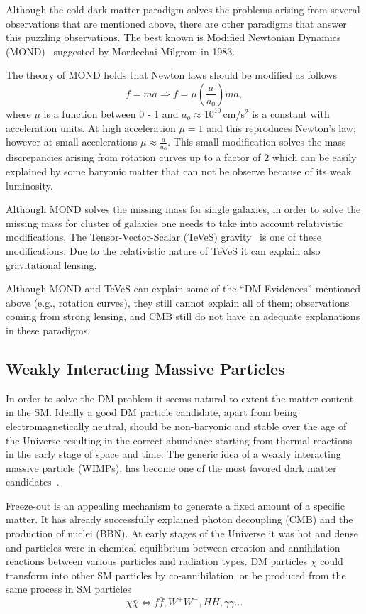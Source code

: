 Although the cold dark matter paradigm solves the problems arising from several observations that are mentioned above, there are other paradigms that answer this puzzling observations. The best known is Modified Newtonian Dynamics (MOND)~\cite{Milgrom:1983ca} suggested by Mordechai Milgrom in 1983.

The theory of MOND holds that Newton laws should be modified as follows
\begin{equation}
	f= ma \Rightarrow f= \mu\left(\frac{a}{a_0}\right)ma,
\end{equation}
where $\mu$ is a function between 0 - 1 and $a_o \approx 10^{10}$\,cm/s$^2$ is a constant with acceleration units. At high acceleration $\mu =1$ and this reproduces Newton’s law; however at small accelerations $\mu \approx \frac{a}{a_0}$. This small modification solves the mass discrepancies arising from rotation curves up to a factor of 2 which can be easily explained by some baryonic matter that can not be observe because of its weak luminosity.

Although MOND solves the missing mass for single galaxies, in order to solve the missing mass for cluster of galaxies one needs to take into account relativistic modifications. The Tensor-Vector-Scalar (TeVeS) gravity~\cite{Bekenstein:2009bd} is one of these modifications. Due to the relativistic nature of TeVeS it can explain also gravitational
lensing.

Although MOND and TeVeS can explain some of the ``DM Evidences'' mentioned above (e.g., rotation curves), they still cannot explain all of them; observations coming from strong lensing, and CMB still do not have an adequate explanations in these paradigms.


\subsection{Weakly Interacting Massive Particles}
\label{subsec:WIMP}

In order to solve the DM problem it seems natural to extent the matter content in the SM. Ideally a good DM particle candidate, apart from being electromagnetically neutral, should be non-baryonic and stable over the age of the Universe resulting in the correct abundance starting from thermal reactions in the early stage of space and time. The generic idea of a weakly
interacting massive particle (WIMPs), has become one of the most favored dark
matter candidates~\cite{Steigman:1984ac}.

Freeze-out is an appealing mechanism to generate a fixed amount of a specific matter. It has already successfully explained photon decoupling (CMB) and the production of nuclei (BBN). At early stages of the Universe it was hot and dense and particles were in chemical equilibrium between creation and annihilation reactions between various particles and radiation types. DM particles $\chi$ could transform into other SM particles by co-annihilation, or be produced from the same process in SM particles  
\begin{equation}
\chi\bar{\chi} \Leftrightarrow f\bar{f}, W^+W^-, HH, \gamma\gamma ...
\end{equation}

